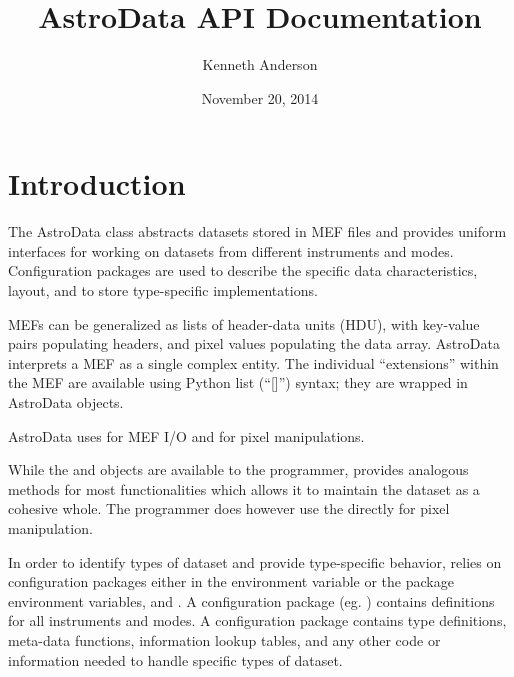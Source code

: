 \documentclass[letterpaper,10pt,english]{sphinxmanual}
\title{AstroData API Documentation}
\date{November 20, 2014}
\author{Kenneth Anderson}
\begin{document}
\maketitle
\tableofcontents
{}\label{index::doc}



\chapter{Introduction}
\label{intro:astrodata-api-documentation}\label{intro:introduction}\label{intro::doc}
The AstroData class abstracts datasets stored in MEF files
and provides uniform interfaces for working on datasets from different
instruments and modes.  Configuration packages are used to describe
the specific data characteristics, layout, and to store type-specific
implementations.

MEFs can be generalized as lists of header-data units (HDU), with key-value
pairs populating headers, and pixel values populating the data array.
AstroData interprets a MEF as a single complex entity.  The individual
``extensions'' within the MEF are available using Python list (``{[}{]}'') syntax;
they are wrapped in AstroData objects.

AstroData uses  for MEF I/O and  for pixel manipulations.

While the  and  objects are available to the programmer,
 provides analogous methods for most  functionalities
which allows it to maintain the dataset  as a cohesive whole. The programmer
does however use the  directly for pixel manipulation.

In order to identify types of dataset and provide type-specific behavior,
 relies on configuration packages either in the 
environment variable or the  package environment variables,
 and . A configuration package
(eg. ) contains definitions for all instruments and
modes. A configuration package contains type definitions, meta-data
functions, information lookup tables, and any other code
or information needed to handle specific types of dataset.
\end{document}

